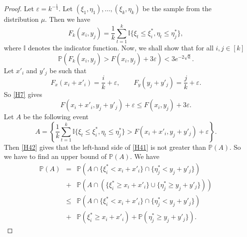 \documentclass[10pt,a4paper]{amsart}
\def\I{{\mathbb {I}}}                       \def\M{{\mathbb {M}}}
\def\P{{\mathbb {P}}}                       \def\Q{{\mathbb {Q}}}
\begin{document}
\begin{proof}
Let $\varepsilon= k^{-\frac{1}{4}}$.
Let $(\xi_1, \eta_1), \dots , (\xi_k, \eta_k)$ be the sample from the distribution $\mu$.
Then we have
\begin{equation} \label{H41-}
F_k(x_i,y_j) = \frac{1}{k} \sum_{t=1}^k \I\{ \xi_t \le \xi_i^\ast, \eta_t \le \eta_j^\ast \} ,
\end{equation} 
where $\I$ denotes the indicator function.
Now, we shall show that for all $i,j\in [k]$
\begin{equation} \label{H41}
\P \left( F_k(x_i,y_j) > F(x_i,y_j) +3\varepsilon   \right)
< 3 e^{-2\sqrt{k}} .
\end{equation} 
Let
$x'_i$ and $y'_j$ be such that
\begin{equation*}
F_x(x_i+ x'_i) = \frac{i}{k }  + \varepsilon, \qquad  F_y(y_j+ y'_j) = \frac{j}{k }  + \varepsilon .
\end{equation*} 
So \eqref{H7} gives
\begin{equation} \label{H42}
F(x_i+ x'_i, y_j+y'_j) +\varepsilon \le F(x_i, y_j) + 3 \varepsilon .
\end{equation} 
Let $A$ be the following event
\begin{equation} \label{H42+}
A=  \left\{\frac{1}{k} \sum_{t=1}^k \I\{ \xi_t \le \xi_i^\ast, \eta_t \le \eta_j^\ast \} 
> F(x_i+ x'_i, y_j+y'_j) +\varepsilon  \right\} .
\end{equation} 
Then \eqref{H42} gives that the left-hand side of \eqref{H41} is not greater than $\P(A)$.
So we have to find an upper bound of $\P(A)$.
We have
\begin{eqnarray} \label{H43}
\P(A) &=& \P\left(A \cap \{ \xi^\ast_i <  x_i+ x'_i  \} \cap \{ \eta^\ast_j <  y_j+ y'_j  \} \right) \\
&+&\P\left(A \cap \left(\{ \xi^\ast_i \ge  x_i+ x'_i  \} 
\cup \{ \eta^\ast_j \ge  y_j+ y'_j  \} \right) \right) \nonumber \\
&\le&
\P\left(A \cap \{ \xi^\ast_i <  x_i+ x'_i  \} \cap \{ \eta^\ast_j <  y_j+ y'_j  \} \right) \nonumber \\
&+&\P\left(\xi^\ast_i \ge  x_i+ x'_i  \right) +
\P\left( \eta^\ast_j \ge  y_j+ y'_j  \} \right) . \nonumber 
\end{eqnarray}


\end{proof}
\end{document}

